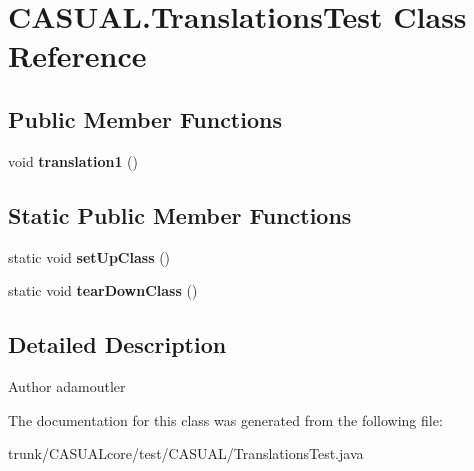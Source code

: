 \hypertarget{class_c_a_s_u_a_l_1_1_translations_test}{\section{C\-A\-S\-U\-A\-L.\-Translations\-Test Class Reference}
\label{class_c_a_s_u_a_l_1_1_translations_test}
}
\subsection*{Public Member Functions}
\begin{DoxyCompactItemize}
\item 
\hypertarget{class_c_a_s_u_a_l_1_1_translations_test_a7a0fd0a580f7479985835b31c4693fb4}{void {\bfseries translation1} ()}\label{class_c_a_s_u_a_l_1_1_translations_test_a7a0fd0a580f7479985835b31c4693fb4}

\end{DoxyCompactItemize}
\subsection*{Static Public Member Functions}
\begin{DoxyCompactItemize}
\item 
\hypertarget{class_c_a_s_u_a_l_1_1_translations_test_a996baecd9242ec89d7907086b88257dc}{static void {\bfseries set\-Up\-Class} ()}\label{class_c_a_s_u_a_l_1_1_translations_test_a996baecd9242ec89d7907086b88257dc}

\item 
\hypertarget{class_c_a_s_u_a_l_1_1_translations_test_a2642ae0a02b26ffa5b222025f85f9be2}{static void {\bfseries tear\-Down\-Class} ()}\label{class_c_a_s_u_a_l_1_1_translations_test_a2642ae0a02b26ffa5b222025f85f9be2}

\end{DoxyCompactItemize}


\subsection{Detailed Description}
\begin{DoxyAuthor}{Author}
adamoutler 
\end{DoxyAuthor}


The documentation for this class was generated from the following file\-:\begin{DoxyCompactItemize}
\item 
trunk/\-C\-A\-S\-U\-A\-Lcore/test/\-C\-A\-S\-U\-A\-L/Translations\-Test.\-java\end{DoxyCompactItemize}
